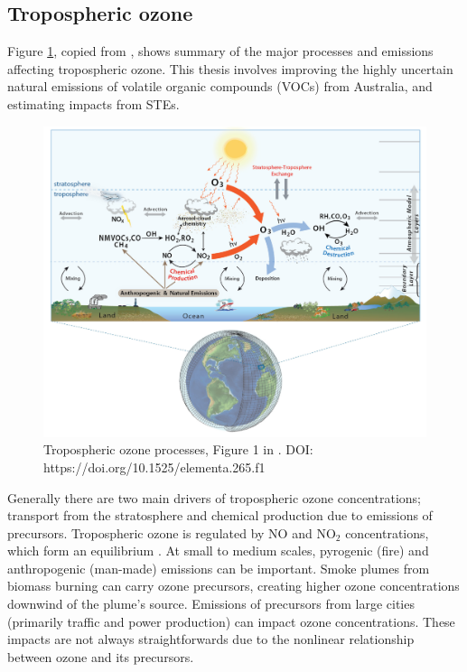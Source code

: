   \subsection{Tropospheric ozone}
    Figure \ref{LR:O3:fig_YoungOzoneSummary}, copied from \textcite{Young2018}, shows summary of the major processes and emissions affecting tropospheric ozone.
    This thesis involves improving the highly uncertain natural emissions of volatile organic compounds (VOCs) from Australia, and estimating impacts from STEs.
    
    \begin{figure}
      \includegraphics[width=\textwidth]{Figures/Young2018_Figure1.png}
      \caption{%
        Tropospheric ozone processes, Figure 1 in \textcite{Young2018}.
        DOI: https://doi.org/10.1525/elementa.265.f1
      }
      \label{LR:O3:fig_YoungOzoneSummary}
    \end{figure}
  
    Generally there are two main drivers of tropospheric ozone concentrations; transport from the stratosphere and chemical production due to emissions of precursors. 
    Tropospheric ozone is regulated by NO and NO$_2$ concentrations, which form an equilibrium \parencite{Cape2008,Young2018}.
    At small to medium scales, pyrogenic (fire) and anthropogenic (man-made) emissions can be important.
    Smoke plumes from biomass burning can carry ozone precursors, creating higher ozone concentrations downwind of the plume's source.
    Emissions of precursors from large cities (primarily traffic and power production) can impact ozone concentrations.
    These impacts are not always straightforwards due to the nonlinear relationship between ozone and its precursors.
    
